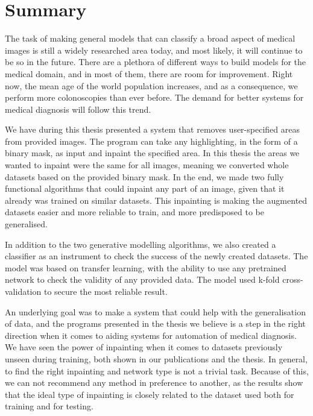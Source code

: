 \section{Summary}
The task of making general models that can classify a broad aspect of medical images is still a widely researched area today, and most likely, it will continue to be so in the future. There are a plethora of different ways to build models for the medical domain, and in most of them, there are room for improvement. Right now, the mean age of the world population increases, and as a consequence, we perform more colonoscopies than ever before. The demand for better systems for medical diagnosis will follow this trend.

We have during this thesis presented a system that removes user-specified areas from provided images. The program can take any highlighting, in the form of a binary mask, as input and inpaint the specified area. In this thesis the areas we wanted to inpaint were the same for all images, meaning we converted whole datasets based on the provided binary mask. In the end, we made two fully functional algorithms that could inpaint any part of an image, given that it already was trained on similar datasets.
This inpainting is making the augmented datasets easier and more reliable to train, and more predisposed to be generalised.

In addition to the two generative modelling algorithms, we also created a classifier as an instrument to check the success of the newly created datasets. The model was based on transfer learning, with the ability to use any pretrained network to check the validity of any provided data. The model used k-fold cross-validation to secure the most reliable result.

An underlying goal was to make a system that could help with the generalisation of data, and the programs presented in the thesis we believe is a step in the right direction when it comes to aiding systems for automation of medical diagnosis.
We have seen the power of inpainting when it comes to datasets previously unseen during training, both shown in our publications and the thesis.
In general, to find the right inpainting and network type is not a trivial task. Because of this, we can not recommend any method in preference to another, as the results show that the ideal type of inpainting is closely related to the dataset used both for training and for testing.

